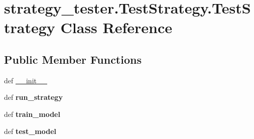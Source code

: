 \hypertarget{classstrategy__tester_1_1TestStrategy_1_1TestStrategy}{\section{strategy\-\_\-tester.\-Test\-Strategy.\-Test\-Strategy \-Class \-Reference}
\label{classstrategy__tester_1_1TestStrategy_1_1TestStrategy}
}
\subsection*{\-Public \-Member \-Functions}
\begin{DoxyCompactItemize}
\item 
def \hyperlink{classstrategy__tester_1_1TestStrategy_1_1TestStrategy_a013c5db22e3ed6ed5cedf3bb4dd8e301}{\-\_\-\-\_\-init\-\_\-\-\_\-}
\item 
\hypertarget{classstrategy__tester_1_1TestStrategy_1_1TestStrategy_a58976df696baf5ce4589d547c37a7f46}{def {\bfseries run\-\_\-strategy}}\label{classstrategy__tester_1_1TestStrategy_1_1TestStrategy_a58976df696baf5ce4589d547c37a7f46}

\item 
\hypertarget{classstrategy__tester_1_1TestStrategy_1_1TestStrategy_a85df2c3edeea34bebd678bbf04046001}{def {\bfseries train\-\_\-model}}\label{classstrategy__tester_1_1TestStrategy_1_1TestStrategy_a85df2c3edeea34bebd678bbf04046001}

\item 
\hypertarget{classstrategy__tester_1_1TestStrategy_1_1TestStrategy_ab05bde5601033db1b989259bf729a79b}{def {\bfseries test\-\_\-model}}\label{classstrategy__tester_1_1TestStrategy_1_1TestStrategy_ab05bde5601033db1b989259bf729a79b}

\end{DoxyCompactItemize}
